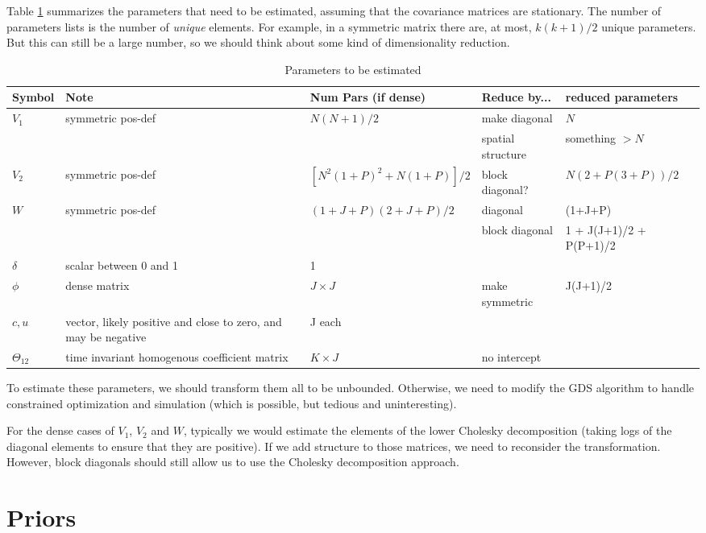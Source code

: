 \documentclass[letter,10pt]{article}
\begin{document}
Table \ref{tab:parameters} summarizes the parameters that need to be
estimated, assuming that the covariance matrices are stationary.  The
number of parameters lists is the number of \emph{unique} elements.
For example, in a symmetric matrix there are, at most, $k(k+1)/2$
unique parameters.  But this can still be a large number, so we should
think about some kind of dimensionality reduction.
\begin{table}[h]\centering
  \begin{tabular}{lllll}
Symbol&Note&Num Pars (if dense)&Reduce by...&reduced parameters\\
\hline
$V_1$&symmetric pos-def&$N(N+1)/2$&make diagonal&$N$\\
&&&spatial structure&something $>N$\\
$V_2$&symmetric pos-def&\parbox{2.5cm}{$[N^2(1+P)^2+N(1+P)]/2$}&block diagonal?&$N(2+P(3+P))/2$\\
$W$&symmetric pos-def&$(1+J+P)(2+J+P)/2$&diagonal& (1+J+P)\\
&&&block diagonal& 1 + J(J+1)/2 + P(P+1)/2\\
$\delta$&scalar between 0 and 1&1&&\\
$\phi$ & dense matrix	&$J \times J$ &make symmetric & J(J+1)/2\\
$c,u$&\parbox{3cm}{vector, likely positive and close to zero, and may be negative}&J each&&\\
$\Theta_{12}$& \parbox{3cm}{time invariant homogenous coefficient matrix}&$K\times J$&no intercept&
  \end{tabular}
\caption{Parameters to be estimated}
\label{tab:parameters}
\end{table}

To estimate these parameters, we should transform them all to be
unbounded.  Otherwise, we need to modify the GDS algorithm to handle
constrained optimization and simulation (which is possible, but
tedious and uninteresting).

For the dense cases of $V_1$, $V_2$ and $W$, typically we would
estimate the elements of the lower Cholesky decomposition (taking logs
of the diagonal elements to ensure that they are positive).  If we add
structure to those matrices, we need to reconsider the
transformation.  However, block diagonals should still allow us to use
the Cholesky decomposition approach.  

\section*{Priors}
\end{document}
